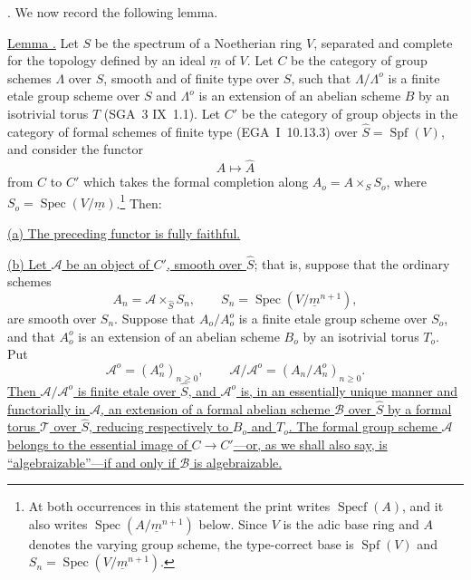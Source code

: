 
\medskip
\noindent
{}. We now record the following lemma.

\medskip
\noindent
\underline{Lemma .} Let $S$ be the spectrum of a Noetherian ring
$V$, separated and complete for the topology defined by an ideal
$\underline m$ of $V$.  Let $C$ be the category of group schemes
$\Lambda$ over $S$, smooth and of finite type over $S$, such that
$\Lambda/\Lambda^o$ is a finite etale group scheme over $S$ and
$\Lambda^o$ is an extension of an abelian scheme $B$ by an isotrivial
torus $T$ (SGA~3 IX~1.1).  Let $C'$ be the category of group objects
in the category of formal schemes of finite type (EGA~I~10.13.3) over
$\widehat S=\operatorname{Spf}(V)$, and consider the functor
\[
 A\longmapsto\widehat A
\]
from $C$ to $C'$ which takes the formal completion along
$A_o=A\times_S S_o$, where
$S_o=\operatorname{Spec}(V/\underline m)$.\footnote{At both occurrences
in this statement the print writes $\operatorname{Specf}(A)$, and it
also writes $\operatorname{Spec}(A/\underline m^{n+1})$ below.  Since
$V$ is the adic base ring and $A$ denotes the varying group scheme,
the type-correct base is $\operatorname{Spf}(V)$ and
$S_n=\operatorname{Spec}(V/\underline m^{n+1})$.} Then:

\smallskip
\noindent
\underline{(a) The preceding functor is fully faithful.}

\smallskip
\noindent
\underline{(b) Let $\mathcal A$ be an object of $C'$, smooth over
$\widehat S$}; that is, suppose that the ordinary schemes
\[
 A_n=\mathcal A\times_{\widehat S}S_n,
 \qquad
 S_n=\operatorname{Spec}(V/\underline m^{n+1}),
\]
are smooth over $S_n$.  Suppose that $A_o/A_o^o$ is a finite etale
group scheme over $S_o$, and that $A_o^o$ is an extension of an
abelian scheme $B_o$ by an isotrivial torus $T_o$.  Put
\[
 \mathcal A^o=(A_n^o)_{n\geq0},
 \qquad
 \mathcal A/\mathcal A^o=(A_n/A_n^o)_{n\geq0}.
\]
\underline{Then $\mathcal A/\mathcal A^o$ is finite etale over
$\widehat S$, and $\mathcal A^o$ is, in an essentially unique manner
and functorially in $\mathcal A$, an extension of a formal abelian
scheme $\mathcal B$ over $\widehat S$ by a formal torus $\mathcal T$
over $\widehat S$, reducing respectively to $B_o$ and $T_o$.  The
formal group scheme $\mathcal A$ belongs to the essential image of
$C\longrightarrow C'$---or, as we shall also say, is
``algebraizable''---if and only if $\mathcal B$ is algebraizable.}

